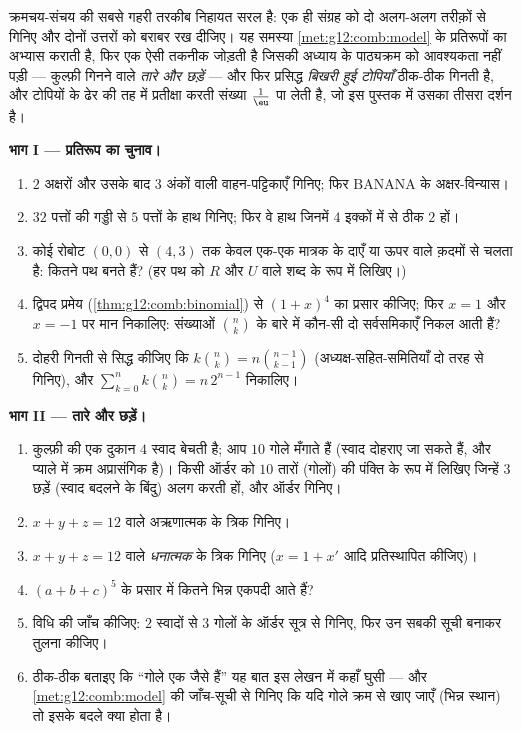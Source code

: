 \begin{problem}
\label{pb:g12:comb:1}
क्रमचय-संचय की सबसे गहरी तरकीब निहायत सरल है: एक ही संग्रह को दो अलग-अलग
तरीक़ों से गिनिए और दोनों उत्तरों को बराबर रख दीजिए। यह समस्या \cref{met:g12:comb:model} के
प्रतिरूपों का अभ्यास कराती है, फिर एक ऐसी तकनीक जोड़ती है जिसकी अध्याय के
पाठ्यक्रम को आवश्यकता नहीं पड़ी --- कुल्फ़ी गिनने वाले \emph{तारे और छड़ें}
--- और फिर प्रसिद्ध \emph{बिखरी हुई टोपियाँ} ठीक-ठीक गिनती है, और टोपियों के
ढेर की तह में प्रतीक्षा करती संख्या $\frac1\eu$ पा लेती है, जो इस पुस्तक में उसका
तीसरा दर्शन है।

\medskip
\noindent\textbf{भाग I --- प्रतिरूप का चुनाव।}
\begin{enumerate}
  \item $2$ अक्षरों और उसके बाद $3$ अंकों वाली वाहन-पट्टिकाएँ गिनिए; फिर
        $\mathrm{BANANA}$ के अक्षर-विन्यास।
  \item $32$ पत्तों की गड्डी से $5$ पत्तों के हाथ गिनिए; फिर वे हाथ जिनमें
        $4$ इक्कों में से ठीक $2$ हों।
  \item कोई रोबोट $(0,0)$ से $(4,3)$ तक केवल एक-एक मात्रक के दाएँ या ऊपर वाले
        क़दमों से चलता है: कितने पथ बनते हैं? (हर पथ को $R$ और $U$ वाले शब्द
        के रूप में लिखिए।)
  \item द्विपद प्रमेय (\cref{thm:g12:comb:binomial}) से $(1 + x)^4$ का प्रसार कीजिए; फिर $x = 1$ और $x = -1$
        पर मान निकालिए: संख्याओं $\binom nk$ के बारे में कौन-सी दो सर्वसमिकाएँ
        निकल आती हैं?
  \item दोहरी गिनती से सिद्ध कीजिए कि $k\binom nk = n\binom{n-1}{k-1}$ (अध्यक्ष-सहित-समितियाँ दो तरह
        से गिनिए), और $\sum_{k=0}^{n} k\binom nk = n\,2^{n-1}$ निकालिए।
\end{enumerate}

\medskip
\noindent\textbf{भाग II --- तारे और छड़ें।}
\begin{enumerate}[resume]
  \item कुल्फ़ी की एक दुकान $4$ स्वाद बेचती है; आप $10$ गोले मँगाते हैं
        (स्वाद दोहराए जा सकते हैं, और प्याले में क्रम अप्रासंगिक है)। किसी
        ऑर्डर को $10$ तारों (गोलों) की पंक्ति के रूप में लिखिए जिन्हें $3$
        छड़ें (स्वाद बदलने के बिंदु) अलग करती हों, और ऑर्डर गिनिए।
  \item $x + y + z = 12$ वाले अऋणात्मक  के त्रिक गिनिए।
  \item $x + y + z = 12$ वाले \emph{धनात्मक}  के त्रिक गिनिए ($x = 1 + x'$ आदि
        प्रतिस्थापित कीजिए)।
  \item $(a + b + c)^5$ के प्रसार में कितने भिन्न एकपदी आते हैं?
  \item विधि की जाँच कीजिए: $2$ स्वादों से $3$ गोलों के ऑर्डर सूत्र से
        गिनिए, फिर उन सबकी सूची बनाकर तुलना कीजिए।
  \item ठीक-ठीक बताइए कि ``गोले एक जैसे हैं'' यह बात इस लेखन में कहाँ घुसी
        --- और \cref{met:g12:comb:model} की जाँच-सूची से गिनिए कि यदि गोले क्रम से खाए जाएँ
        (भिन्न स्थान) तो इसके बदले क्या होता है।
\end{enumerate}


\end{problem}
